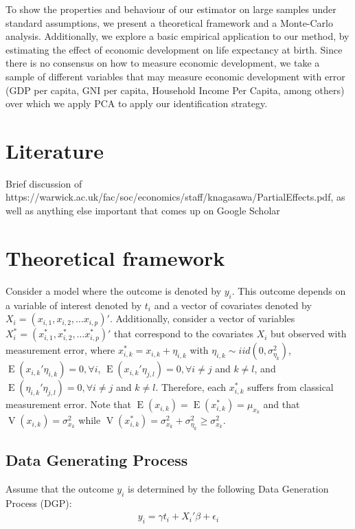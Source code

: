 \documentclass[12pt]{article}
\begin{document}
        To show the properties and behaviour of our estimator on large samples under standard assumptions, we present a theoretical framework and a Monte-Carlo analysis. Additionally, we explore a basic empirical application to our method, by estimating the effect of economic development on life expectancy at birth. Since there is no consensus on how to measure economic development, we take a sample of different variables that may measure economic development with error (GDP per capita, GNI per capita, Household Income Per Capita, among others) over which we apply PCA to apply our identification strategy.

    \section*{Literature}

        Brief discussion of https://warwick.ac.uk/fac/soc/economics/staff/knagasawa/PartialEffects.pdf, as well as anything else important that comes up on Google Scholar

    \section*{Theoretical framework}

        Consider a model where the outcome is denoted by $y_i$. This outcome depends on a variable of interest denoted by $t_i$ and a vector of covariates denoted by $X_i=(x_{i,1},x_{i,2},\dots x_{i,p})'$. Additionally, consider a vector of variables $X^*_i=(x^*_{i,1},x^*_{i,2},\dots x^*_{i,p})'$ that correspond to the covariates $X_i$ but observed with measurement error, where $x^*_{i,k}=x_{i,k}+\eta_{i,k}$ with $\eta_{i,k} \sim {iid}(0,\sigma^2_{\eta_k})$, $\operatorname{E}(x_{i,k}'\eta_{i,k})=0, \forall i$, $\operatorname{E}(x_{i,k}'\eta_{j,l})=0, \forall i\neq j$ and $k \neq l$, and $\operatorname{E}(\eta_{i,k}'\eta_{j,l})=0, \forall i\neq j$ and $k \neq l$. Therefore, each $x^*_{i,k}$ suffers from classical measurement error. Note that $\operatorname{E}(x_{i,k})=\operatorname{E}(x^*_{i,k})=\mu_{x_k}$ and that $\operatorname{V}(x_{i,k})=\sigma^2_{x_k}$ while $\operatorname{V}(x^*_{i,k})=\sigma^2_{x_k}+\sigma^2_{\eta_k}\geq \sigma^2_{x_k}$.

    \subsection*{Data Generating Process}

        Assume that the outcome $y_i$ is determined by the following Data Generation Process (DGP):
        \begin{align}
            y_i = \gamma t_i + X_i'\beta + \epsilon_i
        \end{align}
\end{document}
